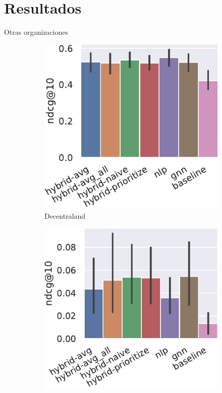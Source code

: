\section{Resultados}
\begin{frame}{Otras organizaciones}
\begin{figure}
    \centering
    \begin{subfigure}{.24\linewidth}
        \includegraphics[width=\linewidth]{./images/graphs/7_all-metrics-Decentraland-ndcg@10.pdf}
        \caption{Decentraland}
    \end{subfigure}\hfill\begin{subfigure}{.24\linewidth}
        \includegraphics[width=\linewidth]{./images/graphs/7_all-metrics-DEAD FoundationsDAO-ndcg@10.pdf}

\end{subfigure}
\end{figure}
\end{frame}
